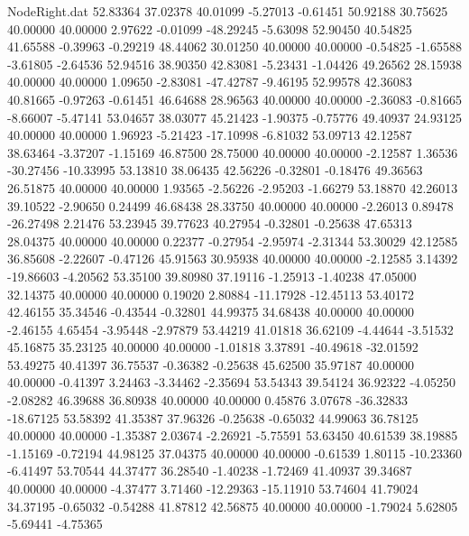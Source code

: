 \begin{filecontents}{NodeRight.dat}
  52.83364   37.02378   40.01099    -5.27013   -0.61451   50.92188   30.75625   40.00000   40.00000    2.97622   -0.01099  -48.29245   -5.63098
  52.90450   40.54825   41.65588    -0.39963   -0.29219   48.44062   30.01250   40.00000   40.00000   -0.54825   -1.65588   -3.61805   -2.64536
  52.94516   38.90350   42.83081    -5.23431   -1.04426   49.26562   28.15938   40.00000   40.00000    1.09650   -2.83081  -47.42787   -9.46195
  52.99578   42.36083   40.81665    -0.97263   -0.61451   46.64688   28.96563   40.00000   40.00000   -2.36083   -0.81665   -8.66007   -5.47141
  53.04657   38.03077   45.21423    -1.90375   -0.75776   49.40937   24.93125   40.00000   40.00000    1.96923   -5.21423  -17.10998   -6.81032
  53.09713   42.12587   38.63464    -3.37207   -1.15169   46.87500   28.75000   40.00000   40.00000   -2.12587    1.36536  -30.27456  -10.33995
  53.13810   38.06435   42.56226    -0.32801   -0.18476   49.36563   26.51875   40.00000   40.00000    1.93565   -2.56226   -2.95203   -1.66279
  53.18870   42.26013   39.10522    -2.90650    0.24499   46.68438   28.33750   40.00000   40.00000   -2.26013    0.89478  -26.27498    2.21476
  53.23945   39.77623   40.27954    -0.32801   -0.25638   47.65313   28.04375   40.00000   40.00000    0.22377   -0.27954   -2.95974   -2.31344
  53.30029   42.12585   36.85608    -2.22607   -0.47126   45.91563   30.95938   40.00000   40.00000   -2.12585    3.14392  -19.86603   -4.20562
  53.35100   39.80980   37.19116    -1.25913   -1.40238   47.05000   32.14375   40.00000   40.00000    0.19020    2.80884  -11.17928  -12.45113
  53.40172   42.46155   35.34546    -0.43544   -0.32801   44.99375   34.68438   40.00000   40.00000   -2.46155    4.65454   -3.95448   -2.97879
  53.44219   41.01818   36.62109    -4.44644   -3.51532   45.16875   35.23125   40.00000   40.00000   -1.01818    3.37891  -40.49618  -32.01592
  53.49275   40.41397   36.75537    -0.36382   -0.25638   45.62500   35.97187   40.00000   40.00000   -0.41397    3.24463   -3.34462   -2.35694
  53.54343   39.54124   36.92322    -4.05250   -2.08282   46.39688   36.80938   40.00000   40.00000    0.45876    3.07678  -36.32833  -18.67125
  53.58392   41.35387   37.96326    -0.25638   -0.65032   44.99063   36.78125   40.00000   40.00000   -1.35387    2.03674   -2.26921   -5.75591
  53.63450   40.61539   38.19885    -1.15169   -0.72194   44.98125   37.04375   40.00000   40.00000   -0.61539    1.80115  -10.23360   -6.41497
  53.70544   44.37477   36.28540    -1.40238   -1.72469   41.40937   39.34687   40.00000   40.00000   -4.37477    3.71460  -12.29363  -15.11910
  53.74604   41.79024   34.37195    -0.65032   -0.54288   41.87812   42.56875   40.00000   40.00000   -1.79024    5.62805   -5.69441   -4.75365

\end{filecontents}
